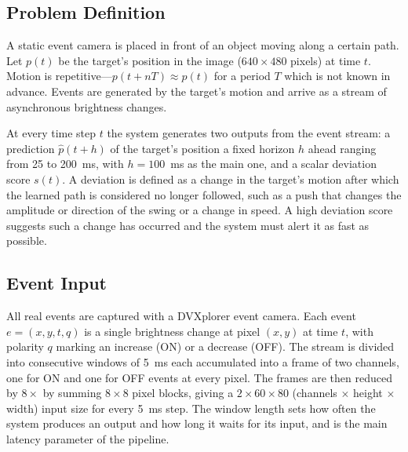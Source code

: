 \documentclass[conference]{IEEEtran}
\begin{document}
\subsection{Problem Definition}
\label{sec:problem}
A static event camera is placed in front of an object moving along a certain path. Let $p(t)$ be the target's position in the image ($640\times480$ pixels) at time $t$. Motion is repetitive---$p(t+nT) \approx p(t)$ for a period $T$ which is not known in advance. Events are generated by the target's motion and arrive as a stream of asynchronous brightness changes.

At every time step $t$ the system generates two outputs from the event stream: a prediction $\hat{p}(t+h)$ of the target's position a fixed horizon $h$ ahead ranging from 25 to 200~ms, with $h = 100$~ms as the main one, and a scalar deviation score $s(t)$. A deviation is defined as a change in the target's motion after which the learned path is considered no longer followed, such as a push that changes the amplitude or direction of the swing or a change in speed. A high deviation score suggests such a change has occurred and the system must alert it as fast as possible.

\subsection{Event Input}
\label{sec:input}
All real events are captured with a DVXplorer event camera. Each event $e=(x, y, t, q)$ is a single brightness change at pixel $(x, y)$ at time $t$, with polarity $q$ marking an increase (ON) or a decrease (OFF). The stream is divided into consecutive windows of 5~ms each accumulated into a frame of two channels, one for ON and one for OFF events at every pixel. The frames are then reduced by $8\times$ by summing $8\times8$ pixel blocks, giving a $2\times60\times80$ (channels $\times$ height $\times$ width) input size for every 5~ms step. The window length sets how often the system produces an output and how long it waits for its input, and is the main latency parameter of the pipeline.
\end{document}
